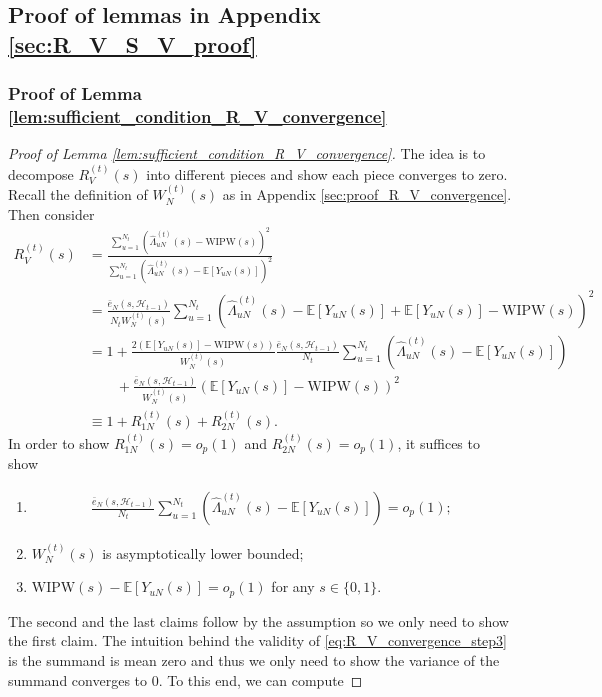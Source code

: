 \documentclass[12pt]{article}
\newcommand{\E}{\mathbb E}								%
\newcommand{\WIPW}{\mathrm{WIPW}}
\begin{document}
\subsection{Proof of lemmas in Appendix \ref{sec:R_V_S_V_proof}}\label{sec:proof_E_3}

\subsubsection{Proof of Lemma \ref{lem:sufficient_condition_R_V_convergence}}


\begin{proof}[Proof of Lemma \ref{lem:sufficient_condition_R_V_convergence}]
	The idea is to decompose $R_V^{(t)}(s)$ into different pieces and show each piece converges to zero. Recall the definition of $W_N^{(t)}(s)$ as in Appendix \ref{sec:proof_R_V_convergence}. Then consider
	\begin{align*}
		R_{V}^{(t)}(s)
		&
		= \frac{\sum_{u=1}^{N_t}(\hat{\Lambda}_{uN}^{(t)}(s)-\WIPW(s))^2}{\sum_{u=1}^{N_t}(\hat{\Lambda}_{uN}^{(t)}(s)-\E[Y_{uN}(s)])^2}\\
		&
		=\frac{\bar e_N(s,\mathcal{H}_{t-1})}{N_tW_N^{(t)}(s)}\sum_{u=1}^{N_t}\left(\hat{\Lambda}_{uN}^{(t)}(s)-\E[Y_{uN}(s)]+\E[Y_{uN}(s)]-\WIPW(s)\right)^2\\
		&
		= 1+\frac{2\left(\E[Y_{uN}(s)]-\WIPW(s)\right)}{W_N^{(t)}(s)}\frac{\bar e_N(s,\mathcal{H}_{t-1})}{N_t}\sum_{u=1}^{N_t}\left(\hat{\Lambda}_{uN}^{(t)}(s)-\E[Y_{uN}(s)]\right)\\
		&
		\qquad +\frac{\bar e_N(s,\mathcal{H}_{t-1})}{W_N^{(t)}(s)}(\E[Y_{uN}(s)]-\WIPW(s))^2\\
		&
		\equiv 1+R_{1N}^{(t)}(s)+R_{2N}^{(t)}(s).
	\end{align*}
	In order to show $R_{1N}^{(t)}(s)=o_p(1)$ and $R_{2N}^{(t)}(s)=o_p(1)$, it suffices to show
	\begin{enumerate}
		\item 
		\begin{align}\label{eq:R_V_convergence_step3}
			\frac{\bar e_N(s,\mathcal{H}_{t-1})}{N_t}\sum_{u=1}^{N_t}(\hat{\Lambda}_{uN}^{(t)}(s)-\E[Y_{uN}(s)])=o_p(1);
		\end{align}
		\item $W_N^{(t)}(s)$ is asymptotically lower bounded;
		\item $\WIPW(s)-\E[Y_{uN}(s)]=o_p(1)$ for any $s\in \{0,1\}$.
	\end{enumerate}
	The second and the last claims follow by the assumption so we only need to show the first claim. The intuition behind the validity of \eqref{eq:R_V_convergence_step3} is the summand is mean zero and thus we only need to show the variance of the summand converges to $0$. To this end, we can compute 

\end{proof}
\end{document}
